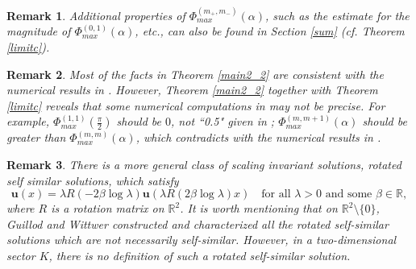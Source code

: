 \documentclass[reqno,12pt]{amsart}
\newtheorem{remark}{Remark}[section]
\newcommand{\Bu}{{\boldsymbol{u}}}
\begin{document}
\begin{remark}
Additional properties of $\Phi^{(m_+,m_-)}_{max}(\alpha)$, such as the estimate for the magnitude of $\Phi^{(0,1)}_{max}(\alpha)$, etc., can also be found in Section \ref{sum} (cf. Theorem \ref{limitc}).    
\end{remark}

\begin{remark}
Most of the facts in Theorem \ref{main2_2} are consistent with the numerical results in \cite{Rosenhead40}. However, Theorem \ref{main2_2} together with Theorem \ref{limitc} reveals that some numerical computations in \cite{Rosenhead40} may not be precise. For example, $\Phi_{max}^{(1, 1)}(\frac{\pi}{2})$ should be $0$, not ``0.5" given in \cite{Rosenhead40}; $\Phi_{max}^{(m, m+1)}(\alpha)$ should be greater than $\Phi_{max}^{(m, m)}(\alpha)$, which contradicts with the numerical results in \cite{Rosenhead40}. 
\end{remark}






\begin{remark}
 There is a more general class of scaling invariant solutions, rotated self similar solutions, 
which satisfy
\[
\Bu(x)= \lambda R(-2\beta \log \lambda) \Bu(\lambda R(2\beta \log \lambda) x)\quad \text{for all }\lambda>0
 \text{  and some  }\beta \in \mathbb{R},
\]
where $R$
is a rotation matrix on $\mathbb{R}^2$.  It is worth mentioning that on $\mathbb{R}^2\setminus \{0\}$, Guillod and Wittwer \cite{GuillodWittwer15SIAM} constructed and characterized all the rotated self-similar solutions which are not necessarily self-similar. However, in a two-dimensional sector $K$, there is no definition of such a rotated self-similar solution.
\end{remark}
\end{document}
